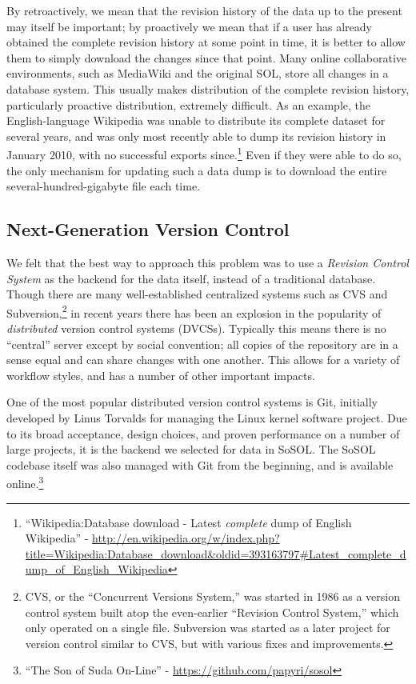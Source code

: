 \documentclass[]{article}
\begin{document}
By retroactively, we mean that the revision history of the data up to the present may itself be important; by proactively we mean that if a user has already obtained the complete revision history at some point in time, it is better to allow them to simply download the changes since that point. Many online collaborative environments, such as MediaWiki and the original SOL, store all changes in a database system. This usually makes distribution of the complete revision history, particularly proactive distribution, extremely difficult. As an example, the English-language Wikipedia was unable to distribute its complete dataset for several years, and was only most recently able to dump its revision history in January 2010, with no successful exports since.\footnote{“Wikipedia:Database download - Latest \emph{complete} dump of English Wikipedia” - \url{http://en.wikipedia.org/w/index.php?title=Wikipedia:Database_download&oldid=393163797\#Latest_complete_dump_of_English_Wikipedia}} Even if they were able to do so, the only mechanism for updating such a data dump is to download the entire several-hundred-gigabyte file each time.

\subsection*{Next-Generation Version Control}

We felt that the best way to approach this problem was to use a \emph{Revision Control System} as the backend for the data itself, instead of a traditional database. Though there are many well-established centralized systems such as CVS and Subversion,\footnote{CVS, or the “Concurrent Versions System,” was started in 1986 as a version control system built atop the even-earlier “Revision Control System,” which only operated on a single file. Subversion was started as a later project for version control similar to CVS, but with various fixes and improvements.} in recent years there has been an explosion in the popularity of \emph{distributed} version control systems (DVCSs). Typically this means there is no “central” server except by social convention; all copies of the repository are in a sense equal and can share changes with one another. This allows for a variety of workflow styles, and has a number of other important impacts.

One of the most popular distributed version control systems is Git, initially developed by Linus Torvalds for managing the Linux kernel software project. Due to its broad acceptance, design choices, and proven performance on a number of large projects, it is the backend we selected for data in SoSOL. The SoSOL codebase itself was also managed with Git from the beginning, and is available online.\footnote{“The Son of Suda On-Line” - \url{https://github.com/papyri/sosol}}
\end{document}
